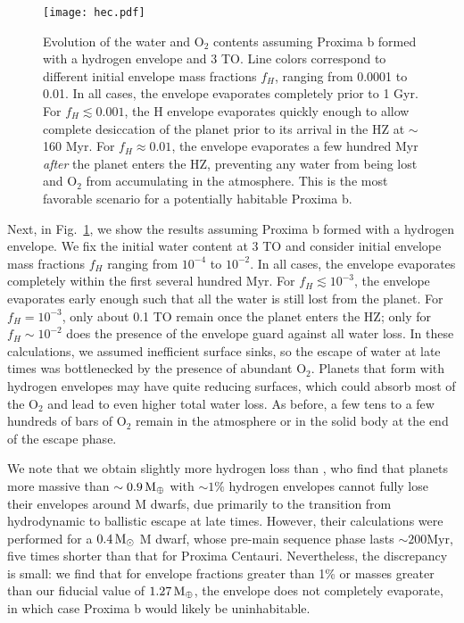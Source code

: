 \documentclass[preprint,12pt]{aastex}
\def\mearth{{\rm\,M_\oplus}}
\def\msun{{\rm\,M_\odot}}
\begin{document}
\begin{figure}[ht]
\centering
\texttt{[image: hec.pdf]}
\caption{Evolution of the water and O$_2$ contents assuming Proxima b
  formed with a hydrogen envelope and 3 TO. Line colors correspond to
  different initial envelope mass fractions $f_H$, ranging from 0.0001
  to 0.01. In all cases, the envelope evaporates completely prior to 1
  Gyr. For $f_H \lesssim 0.001$, the H envelope evaporates quickly
  enough to allow complete desiccation of the planet prior to its
  arrival in the HZ at $\sim$ 160 Myr. For $f_H \approx 0.01$, the
  envelope evaporates a few hundred Myr \emph{after} the planet enters
  the HZ, preventing any water from being lost and O$_2$ from
  accumulating in the atmosphere.  This is the most favorable scenario
  for a potentially habitable Proxima b.}
\label{fig:atmesc:hec}
\end{figure}

Next, in Fig.~\ref{fig:atmesc:hec}, we show the results assuming
Proxima b formed with a hydrogen envelope. We fix the initial water
content at 3 TO and consider initial envelope mass fractions $f_H$
ranging from $10^{-4}$ to $10^{-2}$. In all cases, the envelope
evaporates completely within the first several hundred Myr. For $f_H
\lesssim 10^{-3}$, the envelope evaporates early enough such that all
the water is still lost from the planet. For $f_H = 10^{-3}$, only
about 0.1 TO remain once the planet enters the HZ; only for $f_H \sim
10^{-2}$ does the presence of the envelope guard against all water
loss. In these calculations, we assumed inefficient surface sinks, so
the escape of water at late times was bottlenecked by the presence of
abundant O$_2$. Planets that form with hydrogen envelopes may have
quite reducing surfaces, which could absorb most of the O$_2$ and lead
to even higher total water loss. As before, a few tens to a few
hundreds of bars of O$_2$ remain in the atmosphere or in the solid
body at the end of the escape phase.

We note that we obtain slightly more hydrogen loss than
\cite{OwenMohanty16}, who find that planets more massive than $\sim
0.9 \mearth$ with $\sim 1\%$ hydrogen envelopes cannot fully lose
their envelopes around M dwarfs, due primarily to the transition from
hydrodynamic to ballistic escape at late times. However, their
calculations were performed for a $0.4 \msun$ M dwarf, whose pre-main
sequence phase lasts $\sim 200 \mathrm{Myr}$, five times shorter than
that for Proxima Centauri. Nevertheless, the discrepancy is small: we
find that for envelope fractions greater than 1\% or masses greater
than our fiducial value of $1.27 \mearth$, the envelope does not
completely evaporate, in which case Proxima b would likely be
uninhabitable.
\end{document}
